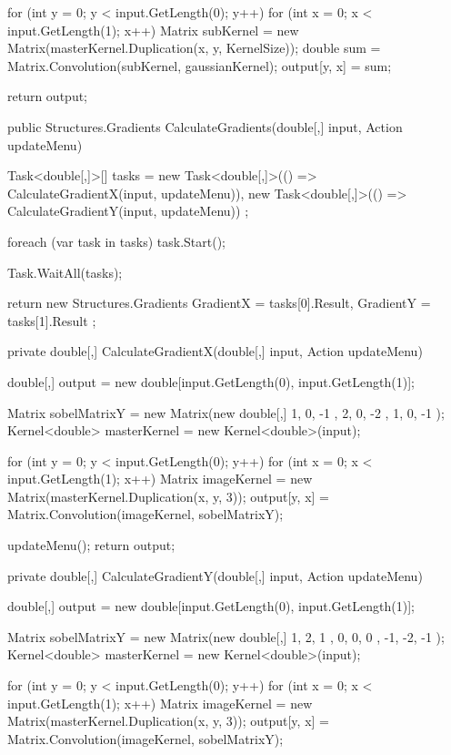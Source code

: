 \begin{flushleft}
\begin{cscode}
{{        for (int y = 0; y < input.GetLength(0); y++)
        {
            for (int x = 0; x < input.GetLength(1); x++)
            {
                Matrix subKernel = new Matrix(masterKernel.Duplication(x, y, KernelSize));
                double sum = Matrix.Convolution(subKernel, gaussianKernel);
                output[y, x] = sum;
            }
        }

        return output;
    }

    public Structures.Gradients CalculateGradients(double[,] input, Action updateMenu)
    {
        Task<double[,]>[] tasks =
        {
            new Task<double[,]>(() => CalculateGradientX(input, updateMenu)),
            new Task<double[,]>(() => CalculateGradientY(input, updateMenu))
        };

        foreach (var task in tasks) task.Start();

        Task.WaitAll(tasks);

        return new Structures.Gradients
        {
            GradientX = tasks[0].Result,
            GradientY = tasks[1].Result
        };
    }

    private double[,] CalculateGradientX(double[,] input, Action updateMenu)
    {
        double[,] output = new double[input.GetLength(0), input.GetLength(1)];

        Matrix sobelMatrixY = new Matrix(new double[,] { { 1, 0, -1 }, { 2, 0, -2 }, { 1, 0, -1 } });
        Kernel<double> masterKernel = new Kernel<double>(input);

        for (int y = 0; y < input.GetLength(0); y++)
        {
            for (int x = 0; x < input.GetLength(1); x++)
            {
                Matrix imageKernel = new Matrix(masterKernel.Duplication(x, y, 3));
                output[y, x] = Matrix.Convolution(imageKernel, sobelMatrixY);
            }
        }

        updateMenu();
        return output;
    }

    private double[,] CalculateGradientY(double[,] input, Action updateMenu)
    {
        double[,] output = new double[input.GetLength(0), input.GetLength(1)];

        Matrix sobelMatrixY = new Matrix(new double[,] { { 1, 2, 1 }, { 0, 0, 0 }, { -1, -2, -1 } });
        Kernel<double> masterKernel = new Kernel<double>(input);

        for (int y = 0; y < input.GetLength(0); y++)
        {
            for (int x = 0; x < input.GetLength(1); x++)
            {
                Matrix imageKernel = new Matrix(masterKernel.Duplication(x, y, 3));
                output[y, x] = Matrix.Convolution(imageKernel, sobelMatrixY);
            }
        }

}}
\end{cscode}
\end{flushleft}
